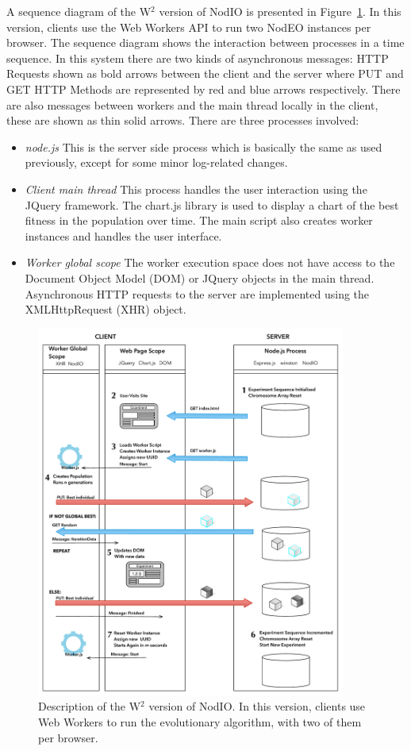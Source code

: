 \documentclass[journal,onecolumn]{IEEEtran}
\begin{document}
A sequence diagram of the W$^2$ version of {\sf NodIO} is presented
in Figure~\ref{fig:system:w2}. In this version, clients use the Web Workers
API to run two NodEO instances per browser. The sequence diagram shows the
interaction between processes in a time sequence. In this system there are
two kinds of asynchronous messages: HTTP Requests shown as bold arrows between
the client and the server where PUT and GET HTTP Methods are represented by
red and blue arrows respectively. There are also messages between workers and
the main thread locally in the client, these are shown as thin solid arrows.
There are three processes involved:
\begin{itemize}
\item {\em node.js} This is the server side process which is basically
  the same as used previously, except for some minor log-related
  changes. 
\item {\em Client main thread}  This process handles the user interaction
using the JQuery framework. The chart.js library is used to display a chart of
the best fitness in the population over time. The main script also creates
worker instances and handles the user interface.
\item {\em Worker global scope} The worker execution space does not have
access to the Document Object Model (DOM) or JQuery objects in the main thread.
Asynchronous HTTP requests to the server are implemented using the
XMLHttpRequest (XHR) object. %
\end{itemize}
%
\begin{figure}[!htb]
\centering
\includegraphics[width=4in]{img/Algorithm.pdf}
\caption{Description of the W$^2$ version of {\sf NodIO}. In this
  version, clients use Web Workers to run the evolutionary algorithm,
  with two of them per browser.}
\label{fig:system:w2}
\end{figure}
\end{document}
